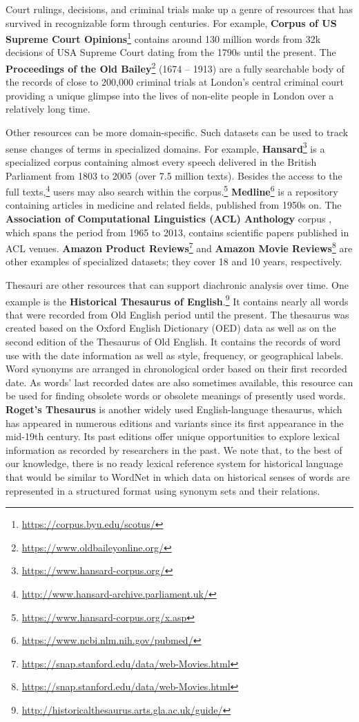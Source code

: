 \documentclass[output=paper]{langsci/langscibook}
\begin{document}
Court rulings, decisions, and criminal trials make up a genre of resources that has survived in recognizable form through centuries. For example, \textbf{Corpus of US Supreme Court Opinions}\footnote{\url{https://corpus.byu.edu/scotus/}} contains around 130 million words from 32k decisions of USA Supreme Court dating from the 1790s until the present. 
The \textbf{Proceedings of the Old Bailey}\footnote{\url{https://www.oldbaileyonline.org/}} (1674 -- 1913) are a fully searchable body of the records of close to 200,000 criminal trials at London's central criminal court providing a unique glimpse into the lives of non-elite people in London over a relatively long time. 

Other resources can be more domain-specific. 
Such datasets can be used to track sense changes of terms in specialized domains.
For example, \textbf{Hansard}\footnote{\url{https://www.hansard-corpus.org/}} is a specialized corpus containing almost every speech delivered in the British Parliament from 1803 to 2005 (over 7.5 million texts). Besides the access to the full texts,\footnote{\url{http://www.hansard-archive.parliament.uk/}} users may also search within the corpus.\footnote{\url{https://www.hansard-corpus.org/x.asp}}
 \textbf{Medline}\footnote{\url{https://www.ncbi.nlm.nih.gov/pubmed/}} is a repository containing articles in medicine and related fields, published from 1950s on. The \textbf{Association of Computational Linguistics (ACL) Anthology} corpus \citep{radev2013acl}, which spans the period from 1965 to 2013, contains scientific papers published in ACL venues. \textbf{Amazon Product Reviews}\footnote{\url{https://snap.stanford.edu/data/web-Movies.html}} and \textbf{Amazon Movie Reviews}\footnote{\url{https://snap.stanford.edu/data/web-Movies.html}} are other examples of specialized datasets; they cover 18 and 10 years, respectively.

Thesauri are other resources that can support diachronic analysis over time. One example is the \textbf{Historical Thesaurus of English}.\footnote{\url{http://historicalthesaurus.arts.gla.ac.uk/guide/}} It contains nearly all words that were recorded from Old English period until the present. The thesaurus was created based on the Oxford English Dictionary (OED) data as well as on the second edition of the Thesaurus of Old English. It contains the records of word use with the date information as well as style, frequency, or geographical labels. Word synonyms are arranged in chronological order based on their first recorded date. As words' last recorded dates are also sometimes available, this resource can be used for finding obsolete words or obsolete meanings of presently used words. \textbf{Roget's Thesaurus} \citep{roget-1852} is another widely used English-language thesaurus, which has appeared in numerous editions and variants since its first appearance in the mid-19th century. Its past editions offer unique opportunities to explore lexical information as recorded by researchers in the past.
We note that, to the best of our knowledge, there is no ready lexical reference system for historical language that would be similar to WordNet \citep{miller1990introduction} in which data on historical senses of words are represented in a structured format using synonym sets and their relations. 
\end{document}
